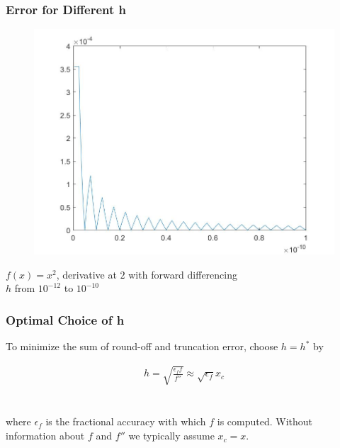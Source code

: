 \documentclass{beamer}
\begin{document}
\begin{frame}
	\frametitle{Error for Different h}
	\begin{figure}
		\centering
			\includegraphics[scale=0.3]{error_diff_sqrt_x}
	\end{figure}
	$f(x) = x^2$, derivative at $2$ with forward differencing\\
	$h$ from $10^{-12}$ to $10^{-10}$
\end{frame}


\begin{frame}
\frametitle{Optimal Choice of h}

To minimize the sum of round-off and truncation error, choose $h=h^*$ by

\begin{align*}
h = \sqrt{\frac{\epsilon_f f}{f''}} \approx \sqrt{\epsilon_f}x_c
\end{align*}
\hfill\\
\hfill\\
where $\epsilon_f$ is the fractional accuracy with which $f$ is computed.  Without information about $f$ and $f''$ we typically assume $x_c = x$.

\end{frame}
\end{document}
